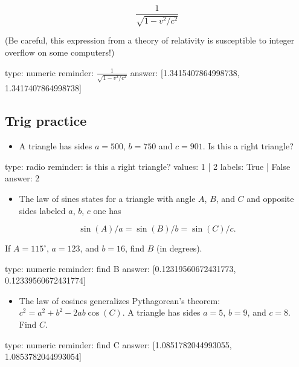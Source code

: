 \documentclass[12pt]{article}
\begin{document}
\[
\frac{1}{\sqrt{1 - v^2/c^2}}
\]

(Be careful, this expression from a theory of relativity is susceptible
to integer overflow on some computers!)

\begin{answer}
    type: numeric
    reminder: \( \frac{1}{\sqrt{1 - v^2/c^2}} \)
    answer: [1.3415407864998738, 1.3417407864998738]

\end{answer}

\subsection{Trig practice}

\begin{itemize}
\itemsep1pt\parskip0pt
\item
  A triangle has sides $a=500$, $b=750$ and $c=901$. Is this a right
  triangle?
\end{itemize}

\begin{answer}
type: radio
reminder: is this a right triangle?
values: 1 | 2
labels: True | False
answer: 2
\end{answer}

\begin{itemize}
\itemsep1pt\parskip0pt
\item
  The law of sines states for a triangle with angle $A$, $B$, and $C$
  and opposite sides labeled $a$, $b$, $c$ one has
\end{itemize}

\[ 
\sin(A)/a = \sin(B)/b = \sin(C)/c.
\]

If $A=115^\circ$, $a=123$, and $b=16$, find $B$ (in degrees).

\begin{answer}
    type: numeric
    reminder: find B
    answer: [0.12319560672431773, 0.12339560672431774]

\end{answer}

\begin{itemize}
\itemsep1pt\parskip0pt
\item
  The law of cosines generalizes Pythagorean's theorem:
  $c^2 = a^2 +   b^2 - 2ab \cos(C)$. A triangle has sides $a=5$, $b=9$,
  and $c=8$. Find $C$.
\end{itemize}

\begin{answer}
    type: numeric
    reminder: find C
    answer: [1.0851782044993055, 1.0853782044993054]

\end{answer}
\end{document}
